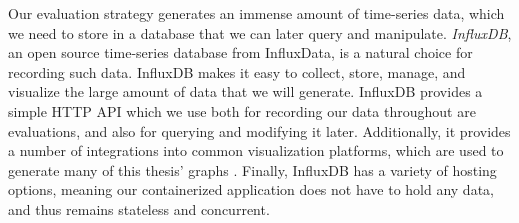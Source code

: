 Our evaluation strategy generates an immense amount of time-series data, which
we need to store in a database that we can later query and manipulate.
\textit{InfluxDB}, an open source time-series database from InfluxData, is a
natural choice for recording such data. InfluxDB makes it easy to collect,
store, manage, and visualize the large amount of data that we will generate.
InfluxDB provides a simple HTTP API which we use both for recording our data
throughout are evaluations, and also for querying and modifying it later.
Additionally, it provides a number of integrations into common visualization
platforms, which are used to generate many of this thesis' graphs
\cite{influxdb}. Finally,
InfluxDB has a variety of hosting options, meaning our containerized application
does not have to hold any data, and thus remains stateless and concurrent.
